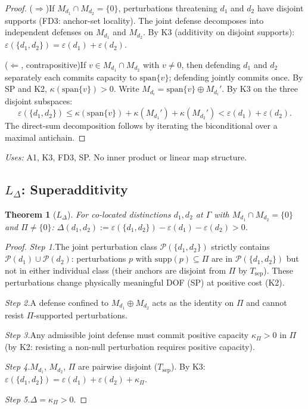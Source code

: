 \documentclass[11pt,a4paper]{article}
\newtheorem{theorem_app}{Theorem}[section]
\theoremstyle{definition}
\begin{document}
\begin{proof}
($\Rightarrow$)\quad If $M_{d_1} \cap M_{d_2} = \{0\}$, perturbations
threatening $d_1$ and $d_2$ have disjoint supports (FD3: anchor-set
locality).  The joint defense decomposes into independent defenses on
$M_{d_1}$ and $M_{d_2}$.  By K3 (additivity on disjoint supports):
$\varepsilon(\{d_1,d_2\}) = \varepsilon(d_1) + \varepsilon(d_2)$.

($\Leftarrow$, contrapositive)\quad If $v \in M_{d_1} \cap M_{d_2}$
with $v \ne 0$, then defending $d_1$ and $d_2$ separately each commits
capacity to $\mathrm{span}\{v\}$; defending jointly commits once.
By SP and K2, $\kappa(\mathrm{span}\{v\}) > 0$.  Write
$M_{d_i} = \mathrm{span}\{v\} \oplus M_{d_i}'$.  By K3 on the three
disjoint subspaces:
\[
  \varepsilon(\{d_1,d_2\}) \le \kappa(\mathrm{span}\{v\})
  + \kappa(M_{d_1}') + \kappa(M_{d_2}')
  < \varepsilon(d_1) + \varepsilon(d_2).
\]
The direct-sum decomposition follows by iterating the biconditional
over a maximal antichain.
\end{proof}

\noindent\textit{Uses:} A1, K3, FD3, SP.  No inner product or linear
map structure.


\subsection{$L_\Delta$: Superadditivity}
\label{app:LDelta}

\begin{theorem_app}[$L_\Delta$]
For co-located distinctions $d_1, d_2$ at $\Gamma$ with
$M_{d_1} \cap M_{d_2} = \{0\}$ and $\Pi \ne \{0\}$:
$\Delta(d_1,d_2) := \varepsilon(\{d_1,d_2\}) - \varepsilon(d_1)
- \varepsilon(d_2) > 0$.
\end{theorem_app}

\begin{proof}
\textit{Step 1.}\quad The joint perturbation class
$\mathcal{P}(\{d_1,d_2\})$ strictly contains
$\mathcal{P}(d_1) \cup \mathcal{P}(d_2)$: perturbations
$p$ with $\mathrm{supp}(p) \subseteq \Pi$ are in
$\mathcal{P}(\{d_1,d_2\})$ but not in either individual class
(their anchors are disjoint from $\Pi$ by $T_{\mathrm{sep}}$).
These perturbations change physically meaningful DOF (SP) at positive
cost (K2).

\textit{Step 2.}\quad A defense confined to $M_{d_1} \oplus M_{d_2}$
acts as the identity on $\Pi$ and cannot resist $\Pi$-supported
perturbations.

\textit{Step 3.}\quad Any admissible joint defense must commit positive
capacity $\kappa_\Pi > 0$ in $\Pi$ (by K2: resisting a non-null
perturbation requires positive capacity).

\textit{Step 4.}\quad $M_{d_1}$, $M_{d_2}$, $\Pi$ are pairwise disjoint
($T_{\mathrm{sep}}$).  By K3:
$\varepsilon(\{d_1,d_2\}) = \varepsilon(d_1) + \varepsilon(d_2)
+ \kappa_\Pi$.

\textit{Step 5.}\quad $\Delta = \kappa_\Pi > 0$.
\end{proof}
\end{document}
